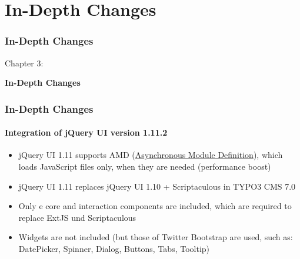 %

\section{In-Depth Changes}
\begin{frame}[fragile]
	\frametitle{In-Depth Changes}

	\begin{center}\huge{Chapter 3:}\end{center}
	\begin{center}\huge{\color{typo3darkgrey}\textbf{In-Depth Changes}}\end{center}

\end{frame}


\begin{frame}[fragile]
	\frametitle{In-Depth Changes}
	\framesubtitle{Integration of jQuery UI version 1.11.2}

	\begin{itemize}
		\item jQuery UI 1.11 supports AMD
			(\href{http://en.wikipedia.org/wiki/Asynchronous_module_definition}{Asynchronous Module Definition}),
			which loads JavaScript files only, when they are needed (performance boost)

    	\item jQuery UI 1.11 replaces jQuery UI 1.10 + Scriptaculous in TYPO3 CMS 7.0

    	\item Only e core and interaction components are included, which are required
    		to replace ExtJS und Scriptaculous

    	\item Widgets are not included (but those of Twitter Bootstrap are used,
    		such as: DatePicker, Spinner, Dialog, Buttons, Tabs, Tooltip)

	\end{itemize}

\end{frame}

